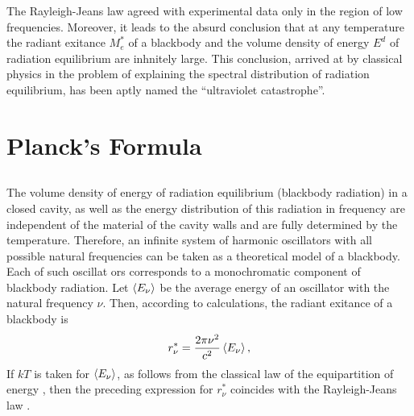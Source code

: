 The Rayleigh-Jeans law agreed with experimental data only
in the region of low frequencies. Moreover, it leads to the absurd conclusion that at any temperature the radiant exitance
$M_{e}^{*}$ of a blackbody and the volume density of energy $E^{d}$ of radiation equilibrium are inhnitely large. This conclusion, arrived at by classical physics in the problem of explaining the spectral distribution of radiation equilibrium, has been aptly named the ``ultraviolet catastrophe''.

\section{Planck's Formula}
\label{sec-36.3} 


\subsection{}\label{36.3.1} The volume density of energy of radiation equilibrium (blackbody radiation) in a closed cavity, as well as the energy distribution of this radiation in frequency are independent of the material of the cavity walls and are fully determined by the temperature. Therefore, an infinite system of harmonic oscillators with all possible natural frequencies can be taken as a theoretical model of a blackbody. Each of such oscillat ors corresponds to a monochromatic component of blackbody radiation. Let
$\expval{E_{\nu}}$ be the average energy of an oscillator with the natural frequency $\nu$. Then, according to calculations, the radiant exitance of a blackbody is
\begin{equation*}%
r_{\nu}^{*} = \frac{2 \pi \nu^{2}}{c^{2}}\expval{E_{\nu}},
\end{equation*}
If $kT$ is taken for $\expval{E_{\nu}}$, as follows from the classical law of the equipartition of energy , then the preceding expression
for $r_{\nu}^{*} $ coincides with the Rayleigh-Jeans law .

